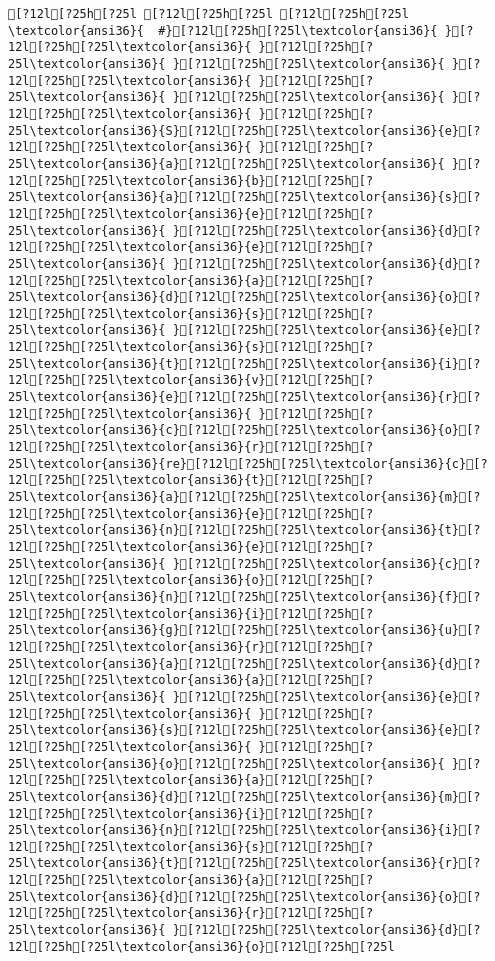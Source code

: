 \documentclass{scrartcl}
\begin{document}
\begin{Verbatim}
[?12l[?25h[?25l [?12l[?25h[?25l [?12l[?25h[?25l
\textcolor{ansi36}{  #}[?12l[?25h[?25l\textcolor{ansi36}{ }[?12l[?25h[?25l\textcolor{ansi36}{ }[?12l[?25h[?25l\textcolor{ansi36}{ }[?12l[?25h[?25l\textcolor{ansi36}{ }[?12l[?25h[?25l\textcolor{ansi36}{ }[?12l[?25h[?25l\textcolor{ansi36}{ }[?12l[?25h[?25l\textcolor{ansi36}{ }[?12l[?25h[?25l\textcolor{ansi36}{ }[?12l[?25h[?25l\textcolor{ansi36}{S}[?12l[?25h[?25l\textcolor{ansi36}{e}[?12l[?25h[?25l\textcolor{ansi36}{ }[?12l[?25h[?25l\textcolor{ansi36}{a}[?12l[?25h[?25l\textcolor{ansi36}{ }[?12l[?25h[?25l\textcolor{ansi36}{b}[?12l[?25h[?25l\textcolor{ansi36}{a}[?12l[?25h[?25l\textcolor{ansi36}{s}[?12l[?25h[?25l\textcolor{ansi36}{e}[?12l[?25h[?25l\textcolor{ansi36}{ }[?12l[?25h[?25l\textcolor{ansi36}{d}[?12l[?25h[?25l\textcolor{ansi36}{e}[?12l[?25h[?25l\textcolor{ansi36}{ }[?12l[?25h[?25l\textcolor{ansi36}{d}[?12l[?25h[?25l\textcolor{ansi36}{a}[?12l[?25h[?25l\textcolor{ansi36}{d}[?12l[?25h[?25l\textcolor{ansi36}{o}[?12l[?25h[?25l\textcolor{ansi36}{s}[?12l[?25h[?25l\textcolor{ansi36}{ }[?12l[?25h[?25l\textcolor{ansi36}{e}[?12l[?25h[?25l\textcolor{ansi36}{s}[?12l[?25h[?25l\textcolor{ansi36}{t}[?12l[?25h[?25l\textcolor{ansi36}{i}[?12l[?25h[?25l\textcolor{ansi36}{v}[?12l[?25h[?25l\textcolor{ansi36}{e}[?12l[?25h[?25l\textcolor{ansi36}{r}[?12l[?25h[?25l\textcolor{ansi36}{ }[?12l[?25h[?25l\textcolor{ansi36}{c}[?12l[?25h[?25l\textcolor{ansi36}{o}[?12l[?25h[?25l\textcolor{ansi36}{r}[?12l[?25h[?25l\textcolor{ansi36}{re}[?12l[?25h[?25l\textcolor{ansi36}{c}[?12l[?25h[?25l\textcolor{ansi36}{t}[?12l[?25h[?25l\textcolor{ansi36}{a}[?12l[?25h[?25l\textcolor{ansi36}{m}[?12l[?25h[?25l\textcolor{ansi36}{e}[?12l[?25h[?25l\textcolor{ansi36}{n}[?12l[?25h[?25l\textcolor{ansi36}{t}[?12l[?25h[?25l\textcolor{ansi36}{e}[?12l[?25h[?25l\textcolor{ansi36}{ }[?12l[?25h[?25l\textcolor{ansi36}{c}[?12l[?25h[?25l\textcolor{ansi36}{o}[?12l[?25h[?25l\textcolor{ansi36}{n}[?12l[?25h[?25l\textcolor{ansi36}{f}[?12l[?25h[?25l\textcolor{ansi36}{i}[?12l[?25h[?25l\textcolor{ansi36}{g}[?12l[?25h[?25l\textcolor{ansi36}{u}[?12l[?25h[?25l\textcolor{ansi36}{r}[?12l[?25h[?25l\textcolor{ansi36}{a}[?12l[?25h[?25l\textcolor{ansi36}{d}[?12l[?25h[?25l\textcolor{ansi36}{a}[?12l[?25h[?25l\textcolor{ansi36}{ }[?12l[?25h[?25l\textcolor{ansi36}{e}[?12l[?25h[?25l\textcolor{ansi36}{ }[?12l[?25h[?25l\textcolor{ansi36}{s}[?12l[?25h[?25l\textcolor{ansi36}{e}[?12l[?25h[?25l\textcolor{ansi36}{ }[?12l[?25h[?25l\textcolor{ansi36}{o}[?12l[?25h[?25l\textcolor{ansi36}{ }[?12l[?25h[?25l\textcolor{ansi36}{a}[?12l[?25h[?25l\textcolor{ansi36}{d}[?12l[?25h[?25l\textcolor{ansi36}{m}[?12l[?25h[?25l\textcolor{ansi36}{i}[?12l[?25h[?25l\textcolor{ansi36}{n}[?12l[?25h[?25l\textcolor{ansi36}{i}[?12l[?25h[?25l\textcolor{ansi36}{s}[?12l[?25h[?25l\textcolor{ansi36}{t}[?12l[?25h[?25l\textcolor{ansi36}{r}[?12l[?25h[?25l\textcolor{ansi36}{a}[?12l[?25h[?25l\textcolor{ansi36}{d}[?12l[?25h[?25l\textcolor{ansi36}{o}[?12l[?25h[?25l\textcolor{ansi36}{r}[?12l[?25h[?25l\textcolor{ansi36}{ }[?12l[?25h[?25l\textcolor{ansi36}{d}[?12l[?25h[?25l\textcolor{ansi36}{o}[?12l[?25h[?25l

\end{Verbatim}
\end{document}
